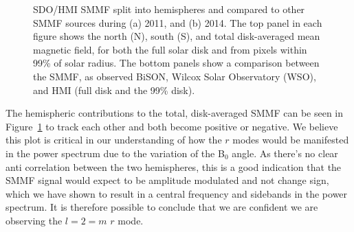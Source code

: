 \begin{figure}[!ht]
	\centering
	\qquad
	\caption{SDO/HMI SMMF split into hemispheres and compared to other SMMF sources during (a) 2011, and (b) 2014. The top panel in each figure shows the north (N), south (S), and total disk-averaged mean magnetic field, for both the full solar disk and from pixels within 99\% of solar radius. The bottom panels show a comparison between the SMMF, as observed BiSON, Wilcox Solar Observatory (WSO), and HMI (full disk and the 99\% disk).}  \label{fig:HMI_MF}
\end{figure}


The hemispheric contributions to the total, disk-averaged SMMF can be seen in Figure~\ref{fig:HMI_MF} to track each other and both become positive or negative. We believe this plot is critical in our understanding of how the $r$ modes would be manifested in the power spectrum due to the variation of the B$_0$ angle. As there's no clear anti correlation between the two hemispheres, this is a good indication that the SMMF signal would expect to be amplitude modulated and not change sign, which we have shown to result in a central frequency and sidebands in the power spectrum. It is therefore possible to conclude that we are confident we are observing the $l=2=m$ $r$ mode.

